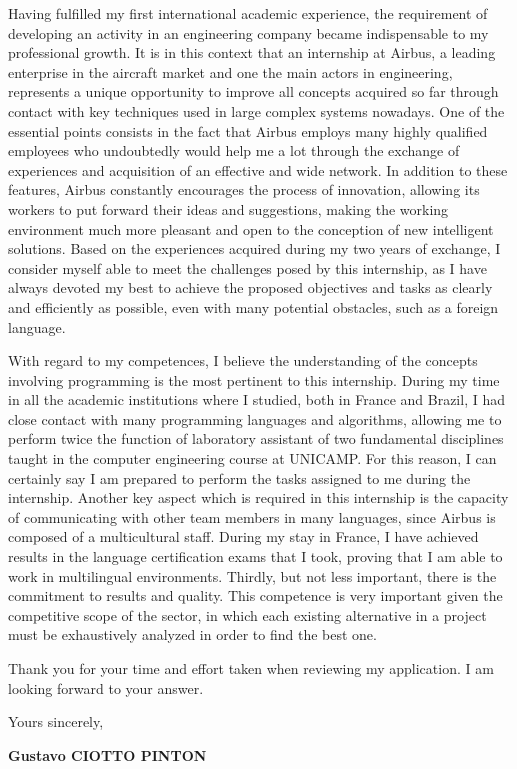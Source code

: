 \documentclass[12pt, a4paper]{article}
\begin{document}
\vspace{12pt}

Having fulfilled my first international academic experience, the requirement of
developing an activity in an engineering company became indispensable to my
professional growth. It is in this context that an internship at Airbus, a
leading enterprise in the aircraft market and one the main actors in
engineering, represents a unique opportunity to improve all concepts acquired
so far through contact with key techniques used in large complex systems
nowadays.  One of the essential points consists in the fact that Airbus employs
many highly qualified employees who undoubtedly would help me a lot through
the exchange of experiences and acquisition of an effective and wide
network. In addition  to these features, Airbus constantly encourages
the process of innovation, allowing its workers to put forward their ideas and
suggestions, making the working environment much more pleasant and open to the
conception of new intelligent solutions. Based on the experiences acquired
during my two years of exchange, I consider myself able to meet the challenges
posed by this internship, as I have always devoted my best to achieve the
proposed objectives and tasks as clearly and efficiently as possible, even with
many potential obstacles, such as a foreign language.


\vspace{12pt}

With regard to my competences,  I believe the understanding of the concepts
involving programming is the most pertinent to this internship. During my time
in all the academic institutions where I studied, both in France and Brazil, I
had close contact with many programming languages and algorithms, allowing me to perform
twice the function of laboratory assistant of two fundamental disciplines taught
in the computer engineering course at UNICAMP. For this reason, I can certainly
say I am prepared to perform the tasks assigned to me during the internship.
Another key aspect which is required in this internship is the capacity of
communicating with other team members in many languages, since Airbus is
composed of a multicultural staff. During my stay in France, I have achieved
results in the language certification exams that I took, proving
that I am able to work in multilingual environments. Thirdly, but not less
important, there is the commitment to results and quality. This competence is very important given
the competitive scope of the sector,  in which each existing alternative  in a
project must be exhaustively analyzed in order to find the best one.


	
\vspace{12pt}

Thank you for your time and effort taken when reviewing my application. I am
looking forward to your answer.

\vspace{12pt}

Yours sincerely,



\begin{flushright}
\textbf{Gustavo CIOTTO PINTON}
\end{flushright}
\end{document}
